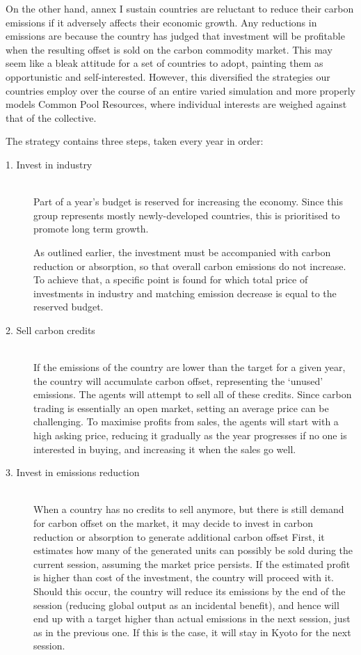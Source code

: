 On the other hand, annex I sustain countries are reluctant to reduce their carbon emissions if it adversely affects their economic growth. Any reductions in emissions are because the country has judged that investment will be profitable when the resulting offset is sold on the carbon commodity market. This may seem like a bleak attitude for a set of countries to adopt, painting them as opportunistic and self-interested. However, this diversified the strategies our countries employ over the course of an entire varied simulation and more properly models Common Pool Resources, where individual interests are weighed against that of the collective.

The strategy contains three steps, taken every year in order:

\begin{description}
	\item[1. Invest in industry] \hfill \\
	Part of a year's budget is reserved for increasing the economy. Since this group represents mostly newly-developed countries, this is prioritised to promote long term growth.

	As outlined earlier, the investment must be accompanied with carbon reduction or absorption, so that overall carbon emissions do not increase. To achieve that, a specific point is found for which total price of investments in industry and matching emission decrease is equal to the reserved budget.

	\item[2. Sell carbon credits] \hfill \\
	If the emissions of the country are lower than the target for a given year, the country will accumulate carbon offset, representing the `unused' emissions. The agents will attempt to sell all of these credits. Since carbon trading is essentially an open market, setting an average price can be challenging. To maximise profits from sales, the agents will start with a high asking price, reducing it gradually as the year progresses if no one is interested in buying, and increasing it when the sales go well.

	\item[3. Invest in emissions reduction] \hfill \\
	When a country has no credits to sell anymore, but there is still demand for carbon offset on the market, it may decide to invest in carbon reduction or absorption to generate additional carbon offset First, it estimates how many of the generated units can possibly be sold during the current session, assuming the market price persists. If the estimated profit is higher than cost of the investment, the country will proceed with it. Should this occur, the country will reduce its emissions by the end of the session (reducing global output as an incidental benefit), and hence will end up with a target higher than actual emissions in the next session, just as in the previous one. If this is the case, it will stay in Kyoto for the next session.
\end{description}


